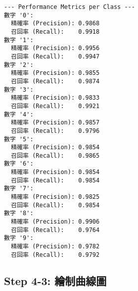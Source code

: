 \documentclass[11pt]{article}
\begin{document}
    \begin{Verbatim}[commandchars=\\\{\}]
--- Performance Metrics per Class ---
數字 '0':
  精確率 (Precision): 0.9868
  召回率 (Recall):    0.9918
數字 '1':
  精確率 (Precision): 0.9956
  召回率 (Recall):    0.9947
數字 '2':
  精確率 (Precision): 0.9855
  召回率 (Recall):    0.9874
數字 '3':
  精確率 (Precision): 0.9833
  召回率 (Recall):    0.9921
數字 '4':
  精確率 (Precision): 0.9857
  召回率 (Recall):    0.9796
數字 '5':
  精確率 (Precision): 0.9854
  召回率 (Recall):    0.9865
數字 '6':
  精確率 (Precision): 0.9854
  召回率 (Recall):    0.9854
數字 '7':
  精確率 (Precision): 0.9825
  召回率 (Recall):    0.9854
數字 '8':
  精確率 (Precision): 0.9906
  召回率 (Recall):    0.9764
數字 '9':
  精確率 (Precision): 0.9782
  召回率 (Recall):    0.9792
    \end{Verbatim}

    \subsection{Step 4-3:
繪制曲線圖}\label{step-4-3-ux7e6aux5236ux66f2ux7ddaux5716}
\end{document}

